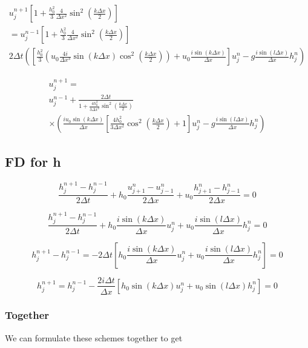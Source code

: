 \documentclass[12pt]{article}
\begin{document}
\begin{multline}
u^{n+1}_j \left[1 +\frac{h_0^2}{3}\frac{4}{\Delta x^2}\sin^2\left(\frac{k\Delta x}{2}\right) \right]
\\ = u^{n-1}_j \left[1 +\frac{h_0^2}{3}\frac{4}{\Delta x^2}\sin^2\left(\frac{k\Delta x}{2}\right) \right]  \\2 \Delta t\left(\left[\frac{h_0^2}{3}\left(u_0 \frac{4i}{\Delta x^3}\sin\left(k\Delta x\right) \cos^2\left(\frac{k\Delta x}{2}\right)  \right) + u_0\frac{i \sin\left(k \Delta x\right)}{\Delta x} \right] u^n_j   - g\frac{i \sin\left(l \Delta x\right)}{\Delta x} h^n_j\right)
\end{multline}

\begin{multline}
u^{n+1}_j =
\\  u^{n-1}_j + \frac{2 \Delta t}{1 +\frac{4h_0^2}{3\Delta x^2}\sin^2\left(\frac{k\Delta x}{2}\right) } \\ \times \left( \frac{i u_0 \sin\left(k \Delta x\right)}{\Delta x} \left[\frac{4h_0^2}{3\Delta x^2} \cos^2\left(\frac{k\Delta x}{2}\right) + 1 \right] u^n_j   - g\frac{i \sin\left(l \Delta x\right)}{\Delta x} h^n_j\right)
\end{multline}





\subsection{FD for h}
\[\frac{h^{n+1}_j - h^{n-1}_j}{2\Delta t} + h_0\frac{u^n_{j+1} -u^n_{j-1} }{2\Delta x}  + u_0 \frac{h^n_{j+1} -h^n_{j-1} }{2\Delta x}  = 0\]


\[\frac{h^{n+1}_j - h^{n-1}_j}{2\Delta t} + h_0\frac{i \sin\left(k \Delta x\right)}{\Delta x} u^n_j  + u_0 \frac{i \sin\left(l \Delta x\right)}{\Delta x}h^{n}_{j}  = 0\]

\[h^{n+1}_j - h^{n-1}_j = -2\Delta t \left[ h_0\frac{i \sin\left(k \Delta x\right)}{\Delta x} u^n_j  +  u_0 \frac{i \sin\left(l \Delta x\right)}{\Delta x}h^{n}_{j} \right]  = 0\]

\[h^{n+1}_j = h^{n-1}_j -\frac{2i\Delta t}{\Delta x} \left[ h_0\sin\left(k \Delta x\right) u^n_j  +  u_0 \sin\left(l \Delta x\right)h^{n}_{j} \right]  = 0\]

\subsubsection{Together}

We can formulate these schemes together to get
\end{document}

